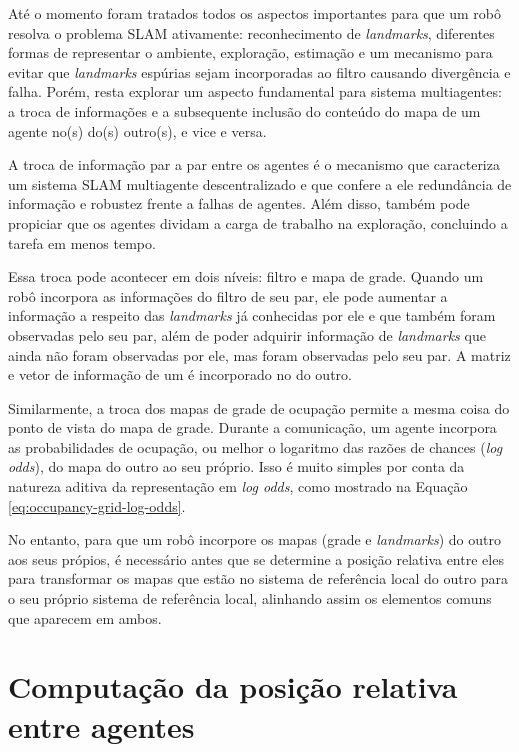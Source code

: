 Até o momento foram tratados todos os aspectos importantes para que 
um robô resolva o problema SLAM ativamente: reconhecimento de 
\textit{landmarks}, diferentes formas de representar o ambiente, 
exploração, estimação e um mecanismo para evitar que \textit{landmarks} 
espúrias sejam incorporadas ao filtro causando divergência e falha. 
Porém, resta explorar um aspecto fundamental para sistema multiagentes: 
a troca de informações e a subsequente inclusão do conteúdo do mapa de um agente 
no(s) do(s) outro(s), e vice e versa.

A troca de informação par a par entre os agentes é o mecanismo que 
caracteriza um sistema SLAM multiagente descentralizado e que confere 
a ele redundância de informação e robustez frente a falhas de agentes. 
Além disso, também pode propiciar que os agentes dividam a carga de 
trabalho na exploração, concluindo a tarefa em menos tempo.

Essa troca pode acontecer em dois níveis: filtro e mapa de grade. 
Quando um robô incorpora as informações do filtro de seu par, 
ele pode aumentar a informação a respeito das \textit{landmarks} já 
conhecidas por ele e que também foram observadas pelo seu par, além de poder 
adquirir informação de \textit{landmarks} que ainda não foram 
observadas por ele, mas foram observadas pelo seu par. A matriz e vetor 
de informação de um é incorporado no do outro.

Similarmente, a troca dos mapas de grade de ocupação permite a mesma 
coisa do ponto de vista do mapa de grade. Durante a comunicação, um 
agente incorpora as probabilidades de ocupação, ou melhor o logaritmo 
das razões de chances (\textit{log odds}), do mapa do outro ao seu 
próprio. Isso é muito simples por conta da natureza aditiva da 
representação em \textit{log odds}, como mostrado na Equação \ref{eq:occupancy-grid-log-odds}.

No entanto, para que um robô incorpore os mapas (grade e \textit{landmarks}) do outro aos seus própios, é necessário antes que se determine a posição relativa entre eles para transformar os 
mapas que estão no sistema de referência local do outro para o seu 
próprio sistema de referência local, alinhando assim os elementos comuns 
que aparecem em ambos.

\section{Computação da posição relativa entre agentes}
\label{sec:point-cloud-registration}

